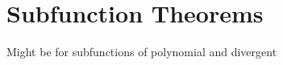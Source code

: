 \documentclass[11pt]{article}
\begin{document}



\newpage

\section{Subfunction Theorems}
Might be for subfunctions of polynomial and divergent
\end{document}

